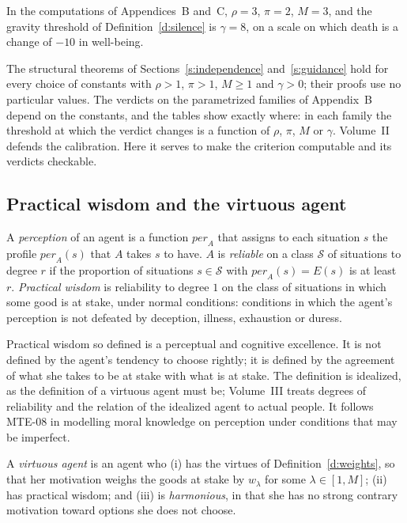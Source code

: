 \documentclass{situationist-preprint}
\begin{document}
\begin{assumption}[Calibration]\label{a:calib}
In the computations of Appendices~B and~C, $\rho=3$, $\pi=2$, $M=3$, and the gravity threshold of Definition~\ref{d:silence} is $\gamma=8$, on a scale on which death is a change of $-10$ in well-being.
\end{assumption}

The structural theorems of Sections~\ref{s:independence} and~\ref{s:guidance} hold for every choice of constants with $\rho>1$, $\pi>1$, $M\geq 1$ and $\gamma>0$; their proofs use no particular values. The verdicts on the parametrized families of Appendix~B depend on the constants, and the tables show exactly where: in each family the threshold at which the verdict changes is a function of $\rho$, $\pi$, $M$ or $\gamma$. Volume~II defends the calibration. Here it serves to make the criterion computable and its verdicts checkable.

\subsection{Practical wisdom and the virtuous agent}

\begin{definition}\label{d:pw}
A \emph{perception} of an agent is a function $\mathit{per}_A$ that assigns to each situation $s$ the profile $\mathit{per}_A(s)$ that $A$ takes $s$ to have. $A$ is \emph{reliable} on a class $\mathcal{S}$ of situations to degree $r$ if the proportion of situations $s\in\mathcal{S}$ with $\mathit{per}_A(s)=E(s)$ is at least $r$. \emph{Practical wisdom} is reliability to degree $1$ on the class of situations in which some good is at stake, under normal conditions: conditions in which the agent's perception is not defeated by deception, illness, exhaustion or duress.
\end{definition}

Practical wisdom so defined is a perceptual and cognitive excellence. It is not defined by the agent's tendency to choose rightly; it is defined by the agreement of what she takes to be at stake with what is at stake. The definition is idealized, as the definition of a virtuous agent must be; Volume~III treats degrees of reliability and the relation of the idealized agent to actual people. It follows MTE-08 in modelling moral knowledge on perception under conditions that may be imperfect.

\begin{definition}\label{d:va}
A \emph{virtuous agent} is an agent who (i) has the virtues of Definition~\ref{d:weights}, so that her motivation weighs the goods at stake by $w_\lambda$ for some $\lambda\in[1,M]$; (ii) has practical wisdom; and (iii) is \emph{harmonious}, in that she has no strong contrary motivation toward options she does not choose.
\end{definition}
\end{document}
